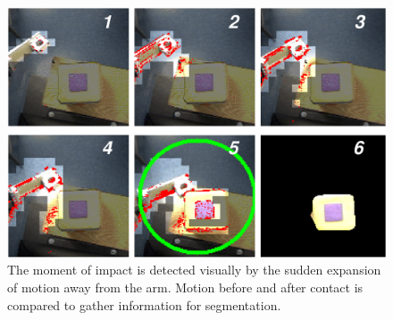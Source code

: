 
\begin{figure}[tbh]
  \begin{center}
    \includegraphics[width=12cm]{collision-detail}
  \end{center}
  \caption{
    The moment of impact is detected visually by the
    sudden expansion of motion away from the arm.  Motion before and
    after contact is compared to gather information for segmentation.
}
\end{figure}

